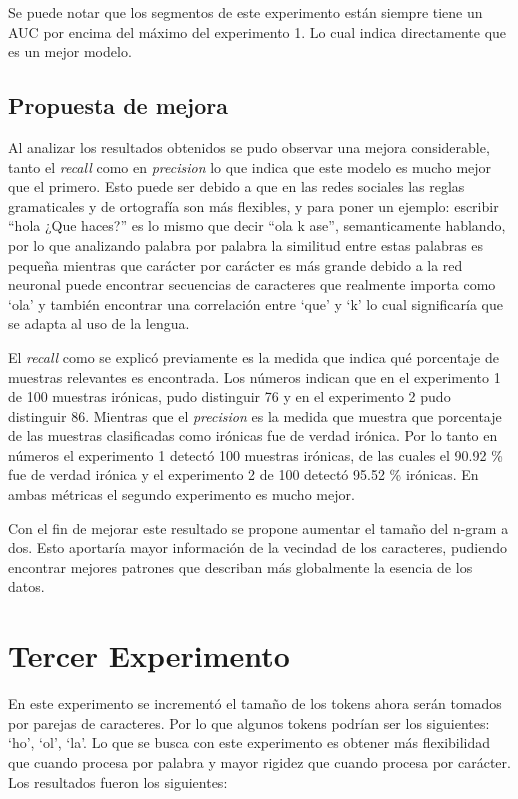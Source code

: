 \par Se puede notar que los segmentos de este experimento están siempre tiene un AUC por encima del máximo del experimento 1. Lo cual indica directamente que es un mejor modelo.

\subsection{Propuesta de mejora} 

\par Al analizar los resultados obtenidos se pudo observar una mejora considerable, tanto el \textit{recall} como en \textit{precision} lo que indica que este modelo es mucho mejor que el primero. Esto puede ser debido a que en las redes sociales las reglas gramaticales y de ortografía son más flexibles, y para poner un ejemplo: escribir
``hola ¿Que haces?'' es lo mismo que decir ``ola k ase'', semanticamente hablando, por lo que analizando palabra por palabra la similitud entre estas palabras es pequeña mientras que carácter por carácter es más grande debido a la red neuronal puede encontrar secuencias de caracteres que realmente importa como `ola'  y también encontrar una correlación entre `que' y `k' lo cual significaría que se adapta al uso de la lengua.

\par El \textit{recall} como se explicó previamente es la medida que indica qué porcentaje de muestras relevantes es encontrada. Los números indican que en el experimento 1 de 100 muestras irónicas, pudo distinguir 76 y en el experimento 2 pudo distinguir 86. Mientras que el \textit{precision} es la medida que muestra que porcentaje de las muestras clasificadas como irónicas fue de verdad irónica. Por lo tanto en números el experimento 1 detectó 100 muestras irónicas, de las cuales el 90.92 \% fue de verdad irónica y el experimento 2 de 100 detectó 95.52 \% irónicas. En ambas métricas el segundo experimento es mucho mejor.

\par Con el fin de mejorar este resultado se propone aumentar el tamaño del n-gram a dos. Esto aportaría mayor información de la vecindad de los caracteres, pudiendo encontrar mejores patrones que describan más globalmente la esencia de los datos.

\section{Tercer Experimento}
\par En este experimento se incrementó el tamaño de los tokens ahora serán tomados por parejas de caracteres. Por lo que algunos tokens podrían ser los siguientes: `ho', `ol', `la'. Lo que se busca con este experimento es obtener más flexibilidad que cuando procesa por palabra y mayor rigidez que cuando procesa por carácter. Los resultados fueron los siguientes:

